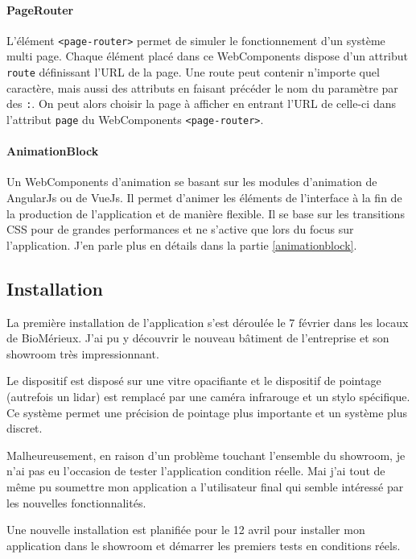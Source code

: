\paragraph{PageRouter} L'élément \texttt{<page-router>} permet de simuler le fonctionnement d'un système multi page.
Chaque élément placé dans ce WebComponents dispose d'un attribut \texttt{route} définissant l'URL de la page.
Une route peut contenir n'importe quel caractère, mais aussi des attributs en faisant précéder le nom du paramètre par des \texttt{:}.
On peut alors choisir la page à afficher en entrant l'URL de celle-ci dans l'attribut \texttt{page} du WebComponents \texttt{<page-router>}.

\paragraph{AnimationBlock} Un WebComponents d'animation se basant sur les modules d'animation de AngularJs ou de VueJs.
Il permet d'animer les éléments de l'interface à la fin de la production de l'application et de manière flexible.
Il se base sur les transitions CSS pour de grandes performances et ne s'active que lors du focus sur l'application.
J'en parle plus en détails dans la partie \ref{animationblock}.

\subsection{Installation}
\label{bmxinstallation}

La première installation de l'application s'est déroulée le 7 février dans les locaux de BioMérieux.
J'ai pu y découvrir le nouveau bâtiment de l'entreprise et son showroom très impressionnant.

Le dispositif est disposé sur une vitre opacifiante et le dispositif de pointage (autrefois un lidar) est remplacé par une caméra infrarouge et un stylo spécifique.
Ce système permet une précision de pointage plus importante et un système plus discret.

Malheureusement, en raison d'un problème touchant l'ensemble du showroom, je n'ai pas eu l'occasion de tester l'application condition réelle.
Mai j'ai tout de même pu soumettre mon application a l'utilisateur final qui semble intéressé par les nouvelles fonctionnalités.

Une nouvelle installation est planifiée pour le 12 avril pour installer mon application dans le showroom et démarrer les premiers tests en conditions réels.

